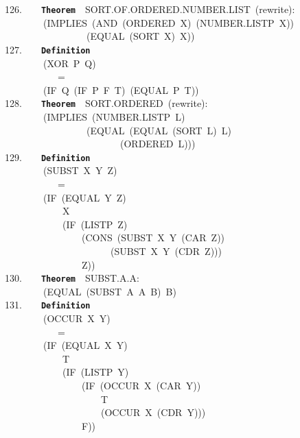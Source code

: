 \documentclass[11pt]{book}
\newenvironment{pubasis}{\begin{flushleft}\ttfamily\small}{\normalsize\rmfamily\end{flushleft}}
\newcommand{\axiomordefinition}[1]{\vspace{6pt}\texttt{\textbf{#1}}}
\begin{document}
\begin{pubasis}
126.~~~~\axiomordefinition{Theorem}~~SORT.OF.ORDERED.NUMBER.LIST~(rewrite):\\
~~~~~~~~(IMPLIES~(AND~(ORDERED~X)~(NUMBER.LISTP~X))\\
~~~~~~~~~~~~~~~~~(EQUAL~(SORT~X)~X))\\

127.~~~~\axiomordefinition{Definition}\\
~~~~~~~~(XOR~P~Q)\\
~~~~~~~~~~~=\\
~~~~~~~~(IF~Q~(IF~P~F~T)~(EQUAL~P~T))\\

128.~~~~\axiomordefinition{Theorem}~~SORT.ORDERED~(rewrite):\\
~~~~~~~~(IMPLIES~(NUMBER.LISTP~L)\\
~~~~~~~~~~~~~~~~~(EQUAL~(EQUAL~(SORT~L)~L)\\
~~~~~~~~~~~~~~~~~~~~~~~~(ORDERED~L)))\\

129.~~~~\axiomordefinition{Definition}\\
~~~~~~~~(SUBST~X~Y~Z)\\
~~~~~~~~~~~=\\
~~~~~~~~(IF~(EQUAL~Y~Z)\\
~~~~~~~~~~~~X\\
~~~~~~~~~~~~(IF~(LISTP~Z)\\
~~~~~~~~~~~~~~~~(CONS~(SUBST~X~Y~(CAR~Z))\\
~~~~~~~~~~~~~~~~~~~~~~(SUBST~X~Y~(CDR~Z)))\\
~~~~~~~~~~~~~~~~Z))\\

130.~~~~\axiomordefinition{Theorem}~~SUBST.A.A:\\
~~~~~~~~(EQUAL~(SUBST~A~A~B)~B)\\

131.~~~~\axiomordefinition{Definition}\\
~~~~~~~~(OCCUR~X~Y)\\
~~~~~~~~~~~=\\
~~~~~~~~(IF~(EQUAL~X~Y)\\
~~~~~~~~~~~~T\\
~~~~~~~~~~~~(IF~(LISTP~Y)\\
~~~~~~~~~~~~~~~~(IF~(OCCUR~X~(CAR~Y))\\
~~~~~~~~~~~~~~~~~~~~T\\
~~~~~~~~~~~~~~~~~~~~(OCCUR~X~(CDR~Y)))\\
~~~~~~~~~~~~~~~~F))\\


\end{pubasis}
\end{document}

